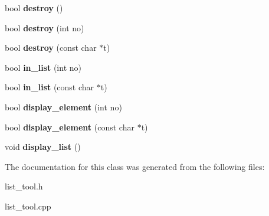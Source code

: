 \begin{DoxyCompactItemize}
\item 
\hypertarget{class_list_a3a325ba9176f9f586c1813655cddcc90}{bool {\bfseries destroy} ()}\label{d1/d34/class_list_a3a325ba9176f9f586c1813655cddcc90}

\item 
\hypertarget{class_list_a2d3c6cfdadbadd2da665f807a6a059ea}{bool {\bfseries destroy} (int no)}\label{d1/d34/class_list_a2d3c6cfdadbadd2da665f807a6a059ea}

\item 
\hypertarget{class_list_ae18e71dbbf3c36a0b7b86c4c3979b932}{bool {\bfseries destroy} (const char $\ast$t)}\label{d1/d34/class_list_ae18e71dbbf3c36a0b7b86c4c3979b932}

\item 
\hypertarget{class_list_a4aa11fb699b249d9b1ba10b43e93895c}{bool {\bfseries in\-\_\-list} (int no)}\label{d1/d34/class_list_a4aa11fb699b249d9b1ba10b43e93895c}

\item 
\hypertarget{class_list_a9a73bf721e7a2adc5077a9a9e3b714a4}{bool {\bfseries in\-\_\-list} (const char $\ast$t)}\label{d1/d34/class_list_a9a73bf721e7a2adc5077a9a9e3b714a4}

\item 
\hypertarget{class_list_ab9b93a54c3a4f7ac14efefabd5362064}{bool {\bfseries display\-\_\-element} (int no)}\label{d1/d34/class_list_ab9b93a54c3a4f7ac14efefabd5362064}

\item 
\hypertarget{class_list_afc83d0de1d1ecb5511df159fb0d223aa}{bool {\bfseries display\-\_\-element} (const char $\ast$t)}\label{d1/d34/class_list_afc83d0de1d1ecb5511df159fb0d223aa}

\item 
\hypertarget{class_list_a1d941e9debc048f974ba0dbeca2e7cc3}{void {\bfseries display\-\_\-list} ()}\label{d1/d34/class_list_a1d941e9debc048f974ba0dbeca2e7cc3}

\end{DoxyCompactItemize}


The documentation for this class was generated from the following files\-:\begin{DoxyCompactItemize}
\item 
list\-\_\-tool.\-h\item 
list\-\_\-tool.\-cpp\end{DoxyCompactItemize}
